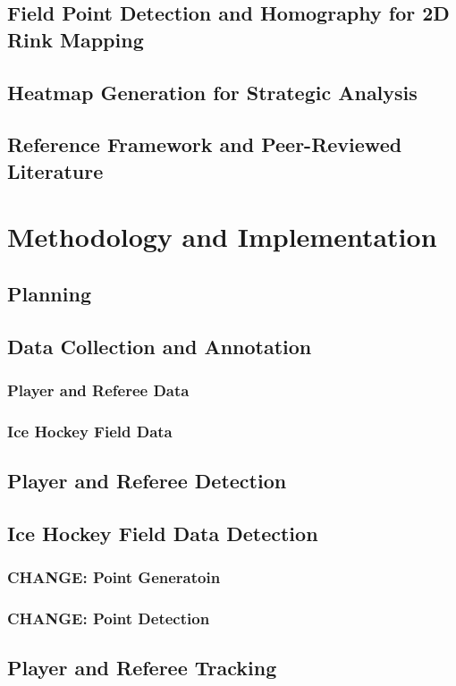 \documentclass[12pt, letterpaper]{article}
\begin{document}
\subsection{Field Point Detection and Homography for 2D Rink Mapping}
\subsection{Heatmap Generation for Strategic Analysis}
\subsection{Reference Framework and Peer-Reviewed Literature}
\newpage

\section{Methodology and Implementation}

\subsection{Planning}
\subsection{Data Collection and Annotation}
\subsubsection{Player and Referee Data}
\subsubsection{Ice Hockey Field Data}
\subsection{Player and Referee Detection}
\subsection{Ice Hockey Field Data Detection}
\subsubsection{\textbf{CHANGE}: Point Generatoin}
\subsubsection{\textbf{CHANGE}: Point Detection}
\subsection{Player and Referee Tracking}
\end{document}
